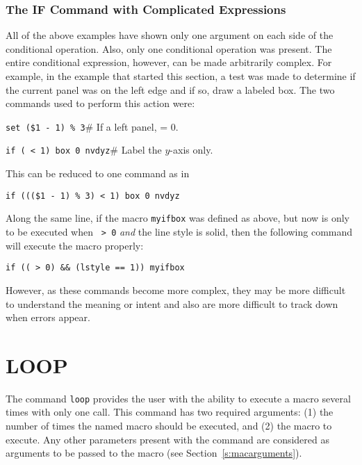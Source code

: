 \subsubsection*         {The IF Command with Complicated Expressions}

All of the above examples have shown only one argument on each side of
the conditional operation.
Also, only one conditional operation was present.
The entire conditional expression, however, can be made arbitrarily complex.
For example, in the example that started this section, a test was made to
determine if the current panel was on the left edge and if so, draw a
labeled box.
The two commands used to perform this action were:
\begin{wiplist}%
  \item [\wipd] {\tt set  (\$1 - 1) \% 3}\hfill\# If a left panel,
     = 0.
\samepage
  \item [\wipd] {\tt if ( < 1) box 0 nvdyz}\hfill\# Label the
    $y$-axis only.
\end{wiplist}
This can be reduced to one command as in
\begin{wiplist}%
  \item [\wipd] {\tt if (((\$1 - 1) \% 3) < 1) box 0 nvdyz}
\end{wiplist}
Along the same line, if the macro {\tt myifbox} was defined as above, but
now is only to be executed when {\tt {} > 0} {\em and}
the line style is solid,
then the following command will execute the macro
properly:
\begin{wiplist}%
  \item [\wipp] {\tt if (( > 0) \&\& (lstyle == 1)) myifbox}
\end{wiplist}
However, as these commands become more complex, they may be more
difficult to understand the meaning or intent and also are more
difficult to track down when errors appear.

\section{LOOP}

The command
{\tt loop}%
provides the user with the ability to execute a macro
several times with only one call.
This command has two required arguments:
(1) the number of times the named macro should be executed, and
(2) the macro to execute.
Any other parameters present with the command are considered as
arguments
to be passed to the macro (see Section~\ref{s:macarguments}).

